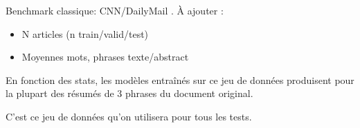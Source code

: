 
Benchmark classique: CNN/DailyMail \citep{DBLP:journals/corr/SeeLM17}. À ajouter :

\begin{itemize}
    \item N articles (n train/valid/test)
    \item Moyennes mots, phrases texte/abstract
\end{itemize}

En fonction des stats, les modèles entraînés sur ce jeu de données produisent
pour la plupart des résumés de 3 phrases du document original.

C'est ce jeu de données qu'on utilisera pour tous les tests.

